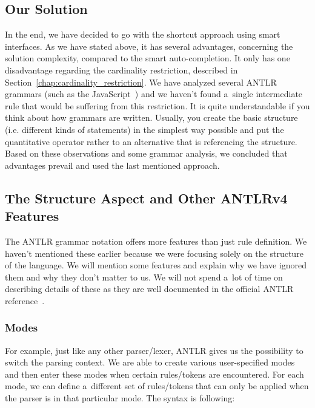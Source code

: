 \subsection{Our Solution}
\label{chap:structure_solution}

In the end, we have decided to go with the shortcut approach using smart interfaces.
As we have stated above, it has several advantages, concerning the solution complexity, compared to the smart auto-completion.
It only has one disadvantage regarding the cardinality restriction, described in Section~\ref{chap:cardinality_restriction}.
We have analyzed several ANTLR grammars (such as the JavaScript~\cite{javascript}) and we haven't found a~single intermediate rule that would be suffering from this restriction.
It is quite understandable if you think about how grammars are written.
Usually, you create the basic structure (i.e. different kinds of statements) in the simplest way possible and put the quantitative operator rather to an alternative that is referencing the structure.
\\

Based on these observations and some grammar analysis, we concluded that advantages prevail and used the last mentioned approach.

\subsection{The Structure Aspect and Other ANTLRv4 Features}
\label{chap:antlr_features}

The ANTLR grammar notation offers more features than just rule definition.
We haven't mentioned these earlier because we were focusing solely on the structure of the language.
We will mention some features and explain why we have ignored them and why they don't matter to us.
We will not spend a~lot of time on describing details of these as they are well documented in the official ANTLR reference~\cite{ANTLR4reference}.

\subsubsection{Modes}

For example, just like any other parser/lexer, ANTLR gives us the possibility to switch the parsing context.
We are able to create various user-specified modes and then enter these modes when certain rules/tokens are encountered.
For each mode, we can define a~different set of rules/tokens that can only be applied when the parser is in that particular mode.
The syntax is following:

